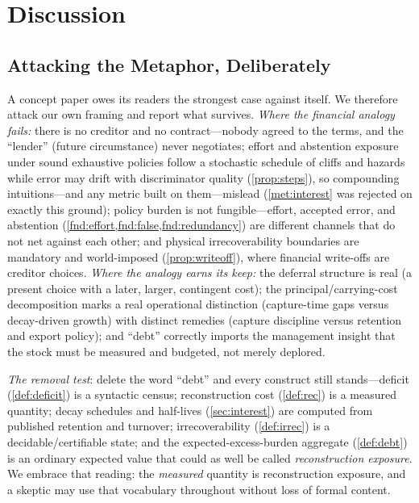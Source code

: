 \section{Discussion}
\label{sec:discussion}

\subsection{Attacking the Metaphor, Deliberately}
\label{sec:disc-metaphor}

A concept paper owes its readers the strongest case against itself. We therefore
attack our own framing and report what survives. \emph{Where the financial analogy fails:} there is no
creditor and no contract---nobody agreed to the terms, and the ``lender'' (future
circumstance) never negotiates; effort and abstention exposure under sound exhaustive
policies follow a stochastic
schedule of cliffs and hazards while error may drift with discriminator quality
(\cref{prop:steps}), so compounding
intuitions---and any metric built on them---mislead (\cref{met:interest} was
rejected on exactly this ground); policy burden is not fungible---effort, accepted
error, and abstention (\cref{fnd:effort,fnd:false,fnd:redundancy}) are different
channels that do
not net against each other; and physical irrecoverability boundaries are mandatory and world-imposed
(\cref{prop:writeoff}), where financial write-offs are creditor choices.
\emph{Where the analogy earns its keep:} the deferral structure is real (a present
choice with a later, larger, contingent cost); the principal/carrying-cost
decomposition marks a real operational distinction (capture-time gaps versus
decay-driven growth) with distinct remedies (capture discipline versus retention
and export policy); and ``debt'' correctly imports the management insight that the
stock must be measured and budgeted, not merely deplored.

\emph{The removal test}: delete the word ``debt'' and every construct still
stands---deficit (\cref{def:deficit}) is a syntactic census; reconstruction cost
(\cref{def:rec}) is a measured quantity; decay schedules and half-lives
(\cref{sec:interest}) are computed from published retention and turnover;
irrecoverability (\cref{def:irrec}) is a decidable/certifiable state; and the
expected-excess-burden aggregate (\cref{def:debt}) is an ordinary expected value that
could as well be called \emph{reconstruction exposure}. We embrace that reading:
the \emph{measured} quantity is reconstruction exposure, and a skeptic may use
that vocabulary throughout without loss of formal content.

